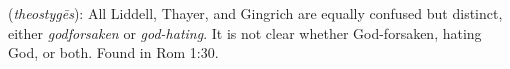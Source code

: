 \item[God-hating (inconclusive),]

(\textit{theostygēs}):
All Liddell, Thayer, and Gingrich are equally confused but distinct, either \emph{godforsaken} or \emph{god-hating}. It is not clear whether God-forsaken, hating God, or both.
Found in Rom 1:30.
